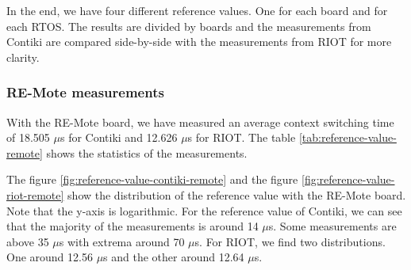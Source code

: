 In the end, we have four different reference values.
One for each board and for each RTOS.
The results are divided by boards and the measurements from Contiki are compared side-by-side with the measurements from RIOT for more clarity.

\subsubsection{RE-Mote measurements}
With the RE-Mote board, we have measured an average context switching time of 18.505 $\mu$s for Contiki and  12.626 $\mu$s for RIOT.
The table \ref{tab:reference-value-remote} shows the statistics of the measurements.



The figure \ref{fig:reference-value-contiki-remote} and the figure \ref{fig:reference-value-riot-remote} show the distribution of the reference value with the RE-Mote board.
Note that the y-axis is logarithmic.
For the reference value of Contiki, we can see that the majority of the measurements is around 14 $\mu$s.
Some measurements are above 35 $\mu$s with extrema around 70 $\mu$s.
For RIOT, we find two distributions.
One around 12.56 $\mu$s and the other around 12.64 $\mu$s.

